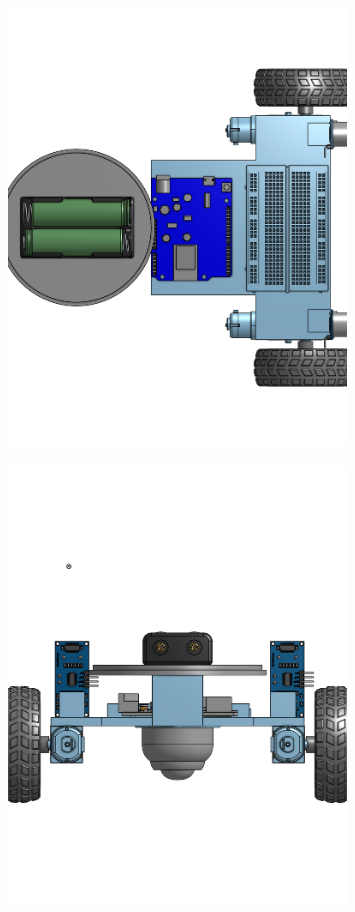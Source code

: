 \documentclass[a4paper,12pt]{article}
\begin{document}
\begin{center}\begin{figure}[H]\centering\includegraphics[width=0.8\textwidth]{./model_images/a5.png}\end{figure}\FloatBarrier\end{center}
\begin{center}\begin{figure}[H]\centering\includegraphics[width=0.8\textwidth]{./model_images/a6.png}\end{figure}\FloatBarrier\end{center}
\end{document}
